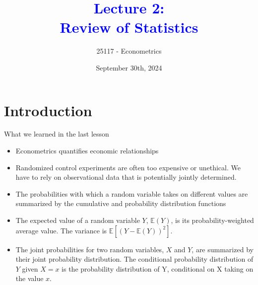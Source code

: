 \documentclass[notes,10pt, aspectratio=169]{beamer}
\title[]{\textcolor{blue}{Lecture 2:\\Review of Statistics}}
\author{25117 - Econometrics}
\institute[shortinst]{Universitat Pompeu Fabra}
\date{September 30th, 2024}
\begin{document}

\begin{frame}[plain]
\maketitle
\end{frame}

\section{Introduction}

\begin{frame}{What we learned in the last lesson}
\begin{itemize}
    \item Econometrics quantifies economic relationships 
    \item Randomized control experiments are often too expensive or unethical. We have to rely on observational data that is potentially jointly determined.
    \item The probabilities with which a random variable takes on different values are summarized by the cumulative and probability distribution functions
    \item The expected value of a random variable $Y$, $\mathbb{E}(Y)$, is its probability-weighted average value. The variance is $\mathbb{E}[(Y-\mathbb{E}(Y))^2]$.
    \item The joint probabilities for two random variables, $X$ and $Y$, are summarized by their joint probability distribution. The conditional probability distribution of $Y$ given $X = x$ is the probability distribution of Y, conditional on X taking on the value $x$.
\end{itemize}
\end{frame}
\end{document}
